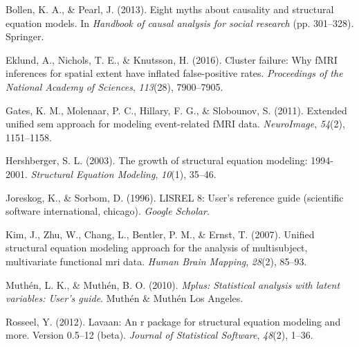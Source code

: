 \documentclass[jou]{apa6}
\theoremstyle{definition}
\theoremstyle{definition}
\theoremstyle{definition}
\theoremstyle{remark}
\begin{document}
\leavevmode\hypertarget{ref-bollen2013eight}{}%
Bollen, K. A., \& Pearl, J. (2013). Eight myths about causality and
structural equation models. In \emph{Handbook of causal analysis for
social research} (pp. 301--328). Springer.

\leavevmode\hypertarget{ref-eklund2016cluster}{}%
Eklund, A., Nichols, T. E., \& Knutsson, H. (2016). Cluster failure: Why
fMRI inferences for spatial extent have inflated false-positive rates.
\emph{Proceedings of the National Academy of Sciences}, \emph{113}(28),
7900--7905.

\leavevmode\hypertarget{ref-gates2011extended}{}%
Gates, K. M., Molenaar, P. C., Hillary, F. G., \& Slobounov, S. (2011).
Extended unified sem approach for modeling event-related fMRI data.
\emph{NeuroImage}, \emph{54}(2), 1151--1158.

\leavevmode\hypertarget{ref-hershberger2003growth}{}%
Hershberger, S. L. (2003). The growth of structural equation modeling:
1994-2001. \emph{Structural Equation Modeling}, \emph{10}(1), 35--46.

\leavevmode\hypertarget{ref-joreskog1996lisrel}{}%
Joreskog, K., \& Sorbom, D. (1996). LISREL 8: User's reference guide
(scientific software international, chicago). \emph{Google Scholar}.

\leavevmode\hypertarget{ref-kim2007unified}{}%
Kim, J., Zhu, W., Chang, L., Bentler, P. M., \& Ernst, T. (2007).
Unified structural equation modeling approach for the analysis of
multisubject, multivariate functional mri data. \emph{Human Brain
Mapping}, \emph{28}(2), 85--93.

\leavevmode\hypertarget{ref-muthen2010mplus}{}%
Muthén, L. K., \& Muthén, B. O. (2010). \emph{Mplus: Statistical
analysis with latent variables: User's guide}. Muthén \& Muthén Los
Angeles.

\leavevmode\hypertarget{ref-rosseel2012lavaan}{}%
Rosseel, Y. (2012). Lavaan: An r package for structural equation
modeling and more. Version 0.5--12 (beta). \emph{Journal of Statistical
Software}, \emph{48}(2), 1--36.
\end{document}
